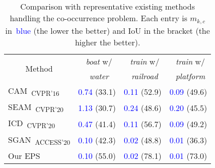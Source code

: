 
\newcommand{\R}{\textcolor{red}}
\newcommand{\B}{\textcolor{blue}}

\begin{table}[]
\centering
{\small
\begin{tabular}{@{}llll@{}}
\toprule
\multicolumn{1}{c}{\multirow{2}{*}{Method}} & \multicolumn{1}{c}{~\emph{boat} w/}   & \multicolumn{1}{c}{~\emph{train} w/}  & \multicolumn{1}{c}{~\emph{train} w/}  \\
& \multicolumn{1}{c}{~\emph{water}} & \multicolumn{1}{c}{~\emph{railroad}}          & \multicolumn{1}{c}{~\emph{platform}}  \\ \midrule
\multicolumn{1}{l}{CAM~\cite{zhou2016learning}\textsubscript{CVPR'16}}              & \B{0.74} (33.1)   & \B{0.11} (52.9)   & \multicolumn{1}{l}{\B{0.09} (49.6)}   \\
\multicolumn{1}{l}{SEAM~\cite{wang2020self}\textsubscript{CVPR'20}}                 & \B{1.13} (30.7)   & \B{0.24} (48.6)   & \multicolumn{1}{l}{\B{0.20} (45.5)}   \\
\multicolumn{1}{l}{ICD~\cite{fan2020learning}\textsubscript{CVPR'20}}               & \B{0.47} (41.4)   & \B{0.11} (56.7)   & \multicolumn{1}{l}{\B{0.09} (49.2)}   \\
\multicolumn{1}{l}{SGAN~\cite{yao2020saliency}\textsubscript{ACCESS'20}}            & \B{0.10} (42.3)   & \B{0.02} (48.8)   & \multicolumn{1}{l}{\B{0.01} (36.3)}   \\
\multicolumn{1}{l}{Our EPS}                                                         & \B{0.10} (55.0)   & \B{0.02} (78.1)   & \multicolumn{1}{l}{\B{0.01} (73.0)}   \\ \bottomrule
\end{tabular}
}
\vspace{2mm}
\caption{Comparison with representative existing methods handling the co-occurrence problem. Each entry is {$m_{k,c}$} in~\B{blue} (the lower the better) and IoU in the bracket (the higher the better).} \vspace{-2mm}
\label{tab:co_quantitative_v4}

\end{table}
